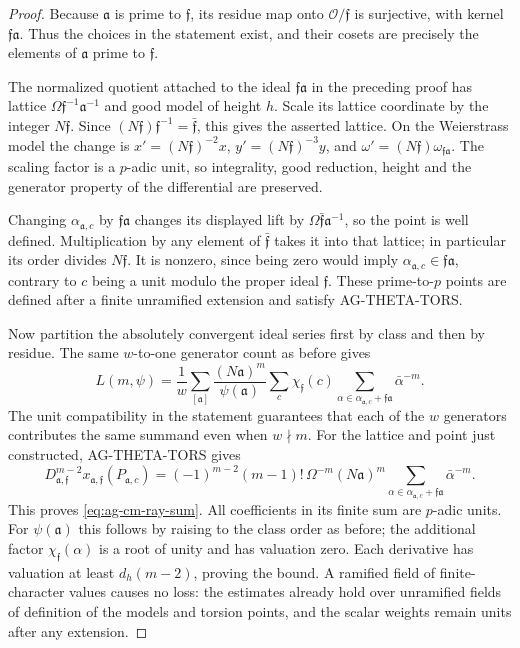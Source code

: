 \begin{proof}
Because $\mathfrak a$ is prime to $\mathfrak f$, its residue
map onto $\mathcal O/\mathfrak f$ is surjective, with kernel
$\mathfrak f\mathfrak a$. Thus the choices in the statement
exist, and their cosets are precisely the elements of
$\mathfrak a$ prime to $\mathfrak f$.

The normalized quotient attached to the ideal
$\mathfrak f\mathfrak a$ in the preceding proof has lattice
$\Omega\mathfrak f^{-1}\mathfrak a^{-1}$ and good model of
height $h$. Scale its lattice coordinate by the integer
$N\mathfrak f$. Since
$(N\mathfrak f)\mathfrak f^{-1}=\bar{\mathfrak f}$, this
gives the asserted lattice. On the Weierstrass model the change
is $x'=(N\mathfrak f)^{-2}x$,
$y'=(N\mathfrak f)^{-3}y$, and
$\omega'=(N\mathfrak f)\omega_{\mathfrak f\mathfrak a}$.
The scaling factor is a $p$-adic unit, so integrality, good
reduction, height and the generator property of the differential
are preserved.

Changing $\alpha_{\mathfrak a,c}$ by
$\mathfrak f\mathfrak a$ changes its displayed lift by
$\Omega\bar{\mathfrak f}\mathfrak a^{-1}$, so the point is
well defined. Multiplication by any element of
$\bar{\mathfrak f}$ takes it into that lattice; in particular
its order divides $N\mathfrak f$. It is nonzero, since being
zero would imply
$\alpha_{\mathfrak a,c}\in\mathfrak f\mathfrak a$, contrary
to $c$ being a unit modulo the proper ideal $\mathfrak f$.
These prime-to-$p$ points are defined after a finite unramified
extension and satisfy AG-THETA-TORS.

Now partition the absolutely convergent ideal series first by
class and then by residue. The same $w$-to-one generator count
as before gives
\[
 L(m,\psi)=\frac1w\sum_{[\mathfrak a]}
   \frac{(N\mathfrak a)^m}{\psi(\mathfrak a)}
   \sum_c\chi_{\mathfrak f}(c)
      \sum_{\alpha\in\alpha_{\mathfrak a,c}
                       +\mathfrak f\mathfrak a}\bar\alpha^{-m}.
\]
The unit compatibility in the statement guarantees that each
of the $w$ generators contributes the same summand even when
$w\nmid m$. For the lattice and point just constructed,
AG-THETA-TORS gives
\[
 D_{\mathfrak a,\mathfrak f}^{m-2}
     x_{\mathfrak a,\mathfrak f}(P_{\mathfrak a,c})
  =(-1)^{m-2}(m-1)!\,\Omega^{-m}(N\mathfrak a)^m
       \sum_{\alpha\in\alpha_{\mathfrak a,c}
                        +\mathfrak f\mathfrak a}\bar\alpha^{-m}.
\]
This proves \eqref{eq:ag-cm-ray-sum}. All coefficients in its
finite sum are $p$-adic units. For $\psi(\mathfrak a)$ this
follows by raising to the class order as before; the additional
factor $\chi_{\mathfrak f}(\alpha)$ is a root of unity and
has valuation zero. Each derivative has valuation at least
$d_h(m-2)$, proving the bound. A ramified field of finite-character
values causes no loss: the estimates already hold over unramified
fields of definition of the models and torsion points, and
the scalar weights remain units after any extension.
\end{proof}

